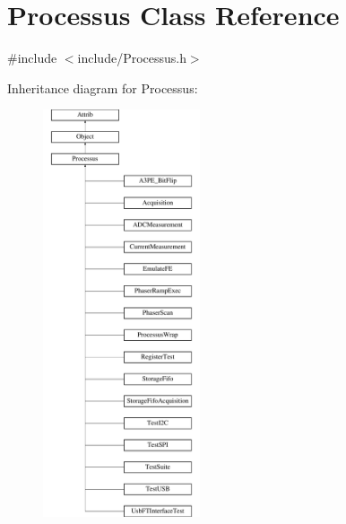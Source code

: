\hypertarget{classProcessus}{}\section{Processus Class Reference}
\label{classProcessus}


{\ttfamily \#include $<$include/\+Processus.\+h$>$}

Inheritance diagram for Processus\+:\begin{figure}[H]
\begin{center}
\leavevmode
\includegraphics[height=12.000000cm]{classProcessus}
\end{center}
\end{figure}
